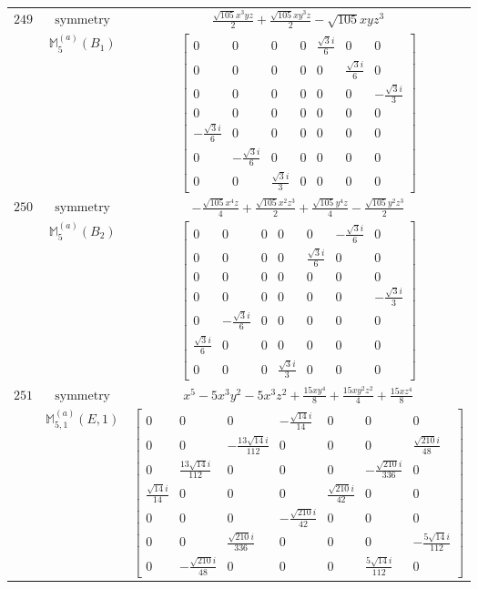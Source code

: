 \documentclass[fleqn,8pt,landscape]{jsarticle}
\begin{document}
\begin{longtable}{ccc}
$ 249 $ & $ \text{symmetry} $ & $ \frac{\sqrt{105} x^{3} y z}{2} + \frac{\sqrt{105} x y^{3} z}{2} - \sqrt{105} x y z^{3} $ \\
$  $ & $ \mathbb{M}_{5}^{(a)}(B_{1}) $ & $ \begin{bmatrix} 0 & 0 & 0 & 0 & \frac{\sqrt{3} i}{6} & 0 & 0 \\ 0 & 0 & 0 & 0 & 0 & \frac{\sqrt{3} i}{6} & 0 \\ 0 & 0 & 0 & 0 & 0 & 0 & - \frac{\sqrt{3} i}{3} \\ 0 & 0 & 0 & 0 & 0 & 0 & 0 \\ - \frac{\sqrt{3} i}{6} & 0 & 0 & 0 & 0 & 0 & 0 \\ 0 & - \frac{\sqrt{3} i}{6} & 0 & 0 & 0 & 0 & 0 \\ 0 & 0 & \frac{\sqrt{3} i}{3} & 0 & 0 & 0 & 0 \end{bmatrix} $ \\ \hline
$ 250 $ & $ \text{symmetry} $ & $ - \frac{\sqrt{105} x^{4} z}{4} + \frac{\sqrt{105} x^{2} z^{3}}{2} + \frac{\sqrt{105} y^{4} z}{4} - \frac{\sqrt{105} y^{2} z^{3}}{2} $ \\
$  $ & $ \mathbb{M}_{5}^{(a)}(B_{2}) $ & $ \begin{bmatrix} 0 & 0 & 0 & 0 & 0 & - \frac{\sqrt{3} i}{6} & 0 \\ 0 & 0 & 0 & 0 & \frac{\sqrt{3} i}{6} & 0 & 0 \\ 0 & 0 & 0 & 0 & 0 & 0 & 0 \\ 0 & 0 & 0 & 0 & 0 & 0 & - \frac{\sqrt{3} i}{3} \\ 0 & - \frac{\sqrt{3} i}{6} & 0 & 0 & 0 & 0 & 0 \\ \frac{\sqrt{3} i}{6} & 0 & 0 & 0 & 0 & 0 & 0 \\ 0 & 0 & 0 & \frac{\sqrt{3} i}{3} & 0 & 0 & 0 \end{bmatrix} $ \\ \hline
$ 251 $ & $ \text{symmetry} $ & $ x^{5} - 5 x^{3} y^{2} - 5 x^{3} z^{2} + \frac{15 x y^{4}}{8} + \frac{15 x y^{2} z^{2}}{4} + \frac{15 x z^{4}}{8} $ \\
$  $ & $ \mathbb{M}_{5,1}^{(a)}(E,1) $ & $ \begin{bmatrix} 0 & 0 & 0 & - \frac{\sqrt{14} i}{14} & 0 & 0 & 0 \\ 0 & 0 & - \frac{13 \sqrt{14} i}{112} & 0 & 0 & 0 & \frac{\sqrt{210} i}{48} \\ 0 & \frac{13 \sqrt{14} i}{112} & 0 & 0 & 0 & - \frac{\sqrt{210} i}{336} & 0 \\ \frac{\sqrt{14} i}{14} & 0 & 0 & 0 & \frac{\sqrt{210} i}{42} & 0 & 0 \\ 0 & 0 & 0 & - \frac{\sqrt{210} i}{42} & 0 & 0 & 0 \\ 0 & 0 & \frac{\sqrt{210} i}{336} & 0 & 0 & 0 & - \frac{5 \sqrt{14} i}{112} \\ 0 & - \frac{\sqrt{210} i}{48} & 0 & 0 & 0 & \frac{5 \sqrt{14} i}{112} & 0 \end{bmatrix} $ \\ \hline

\end{longtable}
\end{document}
